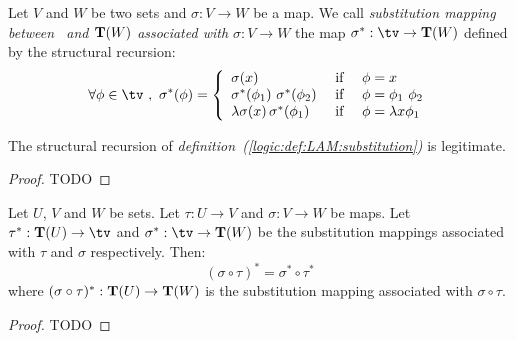 \begin{defin}\label{logic:def:LAM:substitution}
    Let $V$ and $W$ be two sets and $\sigma:V\to W$ be a map. We call
    {\em substitution mapping between \tv\ and ${\bf T}(W)$ associated
    with $\sigma:V\to W$} the map $\sigma^{*}:\tv\to{\bf T}(W)$ defined
    by the structural recursion:
    \begin{equation}\label{logic:eqn:LAM:substitution:recursion}
        \forall\phi\in\tv\ ,\ \sigma^{*}(\phi)=\left\{
            \begin{array}{lcl}
                \sigma(x)
                    &\mbox{\ if\ }&
                \phi=x
                \\
                \sigma^{*}(\phi_{1})\ \sigma^{*}(\phi_{2}) 
                    &\mbox{\ if\ }&
                \phi=\phi_{1}\ \phi_{2}
                \\
                \lambda\sigma(x)\,\sigma^{*}(\phi_{1})
                    &\mbox{\ if\ }&
                \phi=\lambda x\phi_{1}
            \end{array}\right.
    \end{equation}
\end{defin}

\begin{prop}\label{logic:prop:LAM:substitution}
    The structural recursion of 
    {\em definition~(\ref{logic:def:LAM:substitution})} 
    is legitimate.
\end{prop}
\begin{proof}
    TODO
\end{proof}

\begin{prop}\label{logic:prop:LAM:substitution:composition}
    Let $U$, $V$ and $W$ be sets. Let $\tau:U\to V$ and $\sigma:V\to W$
    be maps. Let $\tau^{*}:{\bf T}(U)\to\tv$ and $\sigma^{*}:\tv\to{\bf
    T}(W)$ be the substitution mappings associated with $\tau$ and
    $\sigma$ respectively. Then:
    \[
        (\sigma\circ\tau)^{*}
        =
        \sigma^{*}\circ\tau^{*}
    \]
    where $(\sigma\circ\tau)^{*}:{\bf T}(U)\to {\bf T}(W)$ is the
    substitution mapping associated with $\sigma\circ\tau$.
\end{prop}
\begin{proof}
    TODO
\end{proof}

